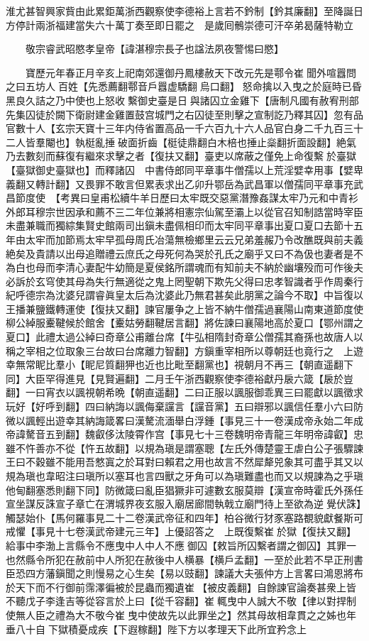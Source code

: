 淮尤甚智興家貲由此累鉅萬浙西觀察使李德裕上言若不鈐制【鈐其廉翻】至降誕日方停計兩浙福建當失六十萬丁奏至即日罷之　是歲囘鶻崇德可汗卒弟曷薩特勒立

　　敬宗睿武昭愍孝皇帝【諱湛穆宗長子也諡法夙夜警惕曰愍】

　　寶歷元年春正月辛亥上祀南郊還御丹鳳樓赦天下改元先是鄠令崔聞外喧囂問之曰五坊人百姓【先悉薦翻鄠音戶囂虚驕翻烏口翻】怒命擒以入曳之於庭時已昏黑良久詰之乃中使也上怒收繫御史臺是日與諸囚立金雞下【唐制凡國有赦宥刑部先集囚徒於闕下衛尉建金雞置鼓宫城門之右囚徒至則擊之宣制訖乃釋其囚】忽有品官數十人【玄宗天寶十三年内侍省置高品一千六百九十六人品官白身二千九百三十二人皆羣閹也】執梃亂捶破面折齒【梃徒鼎翻白木棓也捶止橤翻折面設翻】絶氣乃去數刻而蘇復有繼來求擊之者【復扶又翻】臺吏以席蔽之僅免上命復繫於臺獄【臺獄御史臺獄也】而釋諸囚　中書侍郎同平章事牛僧孺以上荒淫嬖幸用事【嬖卑義翻又轉計翻】又畏罪不敢言但累表求出乙卯升鄂岳為武昌軍以僧孺同平章事充武昌節度使　【考異曰皇甫松續牛羊日歷曰太牢既交惡黨潛豫姦謀太牢乃元和中青衫外郎耳穆宗世因承和薦不三二年位兼將相憲宗仙駕至灞上以從官召知制誥當時宰臣未盡兼職而獨綜集賢史館兩司出鎭未盡佩相印而太牢同平章事出夏口夏口去節十五年由太牢而加節焉太牢早孤母周氏冶蕩無檢鄉里云云兄弟羞赧乃令改醮既與前夫義絶矣及貴請以出母追贈禮云庶氏之母死何為哭於孔氏之廟乎又曰不為伋也妻者是不為白也母而李清心妻配牛幼簡是夏侯銘所謂魂而有知前夫不納於幽壤殁而可作後夫必訴於玄穹使其母為失行無適從之鬼上罔聖朝下欺先父得曰忠孝智識者乎作周秦行紀呼德宗為沈婆兒謂睿眞皇太后為沈婆此乃無君甚矣此朋黨之論今不取】中旨復以王播兼鹽鐵轉運使【復扶又翻】諫官屢争之上皆不納牛僧孺過襄陽山南東道節度使柳公綽服櫜鞬候於館舍【櫜姑勞翻鞬居言翻】將佐諫曰襄陽地高於夏口【鄂州謂之夏口】此禮太過公綽曰奇章公甫離台席【牛弘相隋封奇章公僧孺其裔孫也故唐人以稱之宰相之位取象三台故曰台席離力智翻】方鎭重宰相所以尊朝廷也竟行之　上遊幸無常眤比羣小【眤尼質翻狎也近也比毗至翻黨也】視朝月不再三【朝直遥翻下同】大臣罕得進見【見賢遍翻】二月壬午浙西觀察使李德裕獻丹扆六箴【扆於豈翻】一曰宵衣以諷視朝希晩【朝直遥翻】二曰正服以諷服御乖異三曰罷獻以諷徵求玩好【好呼到翻】四曰納誨以諷侮棄讜言【讜音黨】五曰辯邪以諷信任羣小六曰防微以諷輕出遊幸其納誨箴畧曰漢驁流湎舉白浮鍾【事見三十一卷漢成帝永始二年成帝諱驁音五到翻】魏叡侈汰陵霄作宫【事見七十三卷魏明帝青龍三年明帝諱叡】忠雖不忤善亦不從【忤五故翻】以規為瑱是謂塞聰【左氏外傳楚靈王虐白公子張驟諫王曰不穀雖不能用吾憗寘之於耳對曰賴君之用也故言不然犀犛兕象其可盡乎其又以規為瑱也韋昭注曰瑱所以塞耳也言四獸之牙角可以為瑱難盡也而又以規諫為之乎瑱他甸翻塞悉則翻下同】防微箴曰亂臣猖獗非可遽數玄服莫辯【漢宣帝時霍氏外孫任宣坐謀反誅宣子章亡在渭城界夜玄服入廟居廊間執戟立廟門待上至欲為逆覺伏誅】觸瑟始仆【馬何羅事見二十二卷漢武帝征和四年】柏谷微行犲豕塞路覩貌獻餐斯可戒懼【事見十七卷漢武帝建元三年】上優詔答之　上既復繫崔於獄【復扶又翻】給事中李渤上言縣令不應曳中人中人不應御囚【敕旨所囚繫者謂之御囚】其罪一也然縣令所犯在赦前中人所犯在赦後中人横暴【横戶孟翻】一至於此若不早正刑書臣恐四方藩鎭聞之則慢易之心生矣【易以豉翻】諫議大夫張仲方上言畧曰鴻恩將布於天下而不行御前霈澤徧被於昆蟲而獨遺崔【被皮義翻】自餘諫官論奏甚衆上皆不聽戊子李逢吉等從容言於上曰【從千容翻】崔輒曳中人誠大不敬【律以對捍制使無人臣之禮為大不敬今崔曳中使故先以此罪坐之】然其母故相韋貫之之姊也年垂八十自下獄積憂成疾【下遐稼翻】陛下方以孝理天下此所宜矜念上